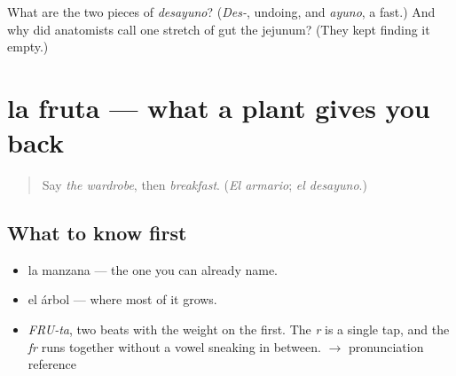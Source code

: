 \begin{tcolorbox}[breakable,colback=teal!4,colframe=teal!35!black,title={Before you move on}]
What are the two pieces of \emph{desayuno}? (\emph{Des-}, undoing, and \emph{ayuno}, a fast.) And why did anatomists call one stretch of gut the jejunum? (They kept finding it empty.)
\end{tcolorbox}
\section[la fruta]{la fruta — what a plant gives you back}

\label{lesson:ES-C367-fruta}



\begin{quote}
Say \emph{the wardrobe}, then \emph{breakfast}. (\emph{El armario}; \emph{el desayuno}.)
\end{quote}

\subsection*{What to know first}
\begin{itemize}
\raggedright
  \item la manzana — the one you can already name.
  \item el árbol — where most of it grows.
\end{itemize}

\begin{sounds}
\begin{itemize}
\raggedright
  \item \emph{FRU-ta}, two beats with the weight on the first. The \emph{r} is a single tap, and the \emph{fr} runs together without a vowel sneaking in between. $\to$ pronunciation reference
\end{itemize}
\end{sounds}

